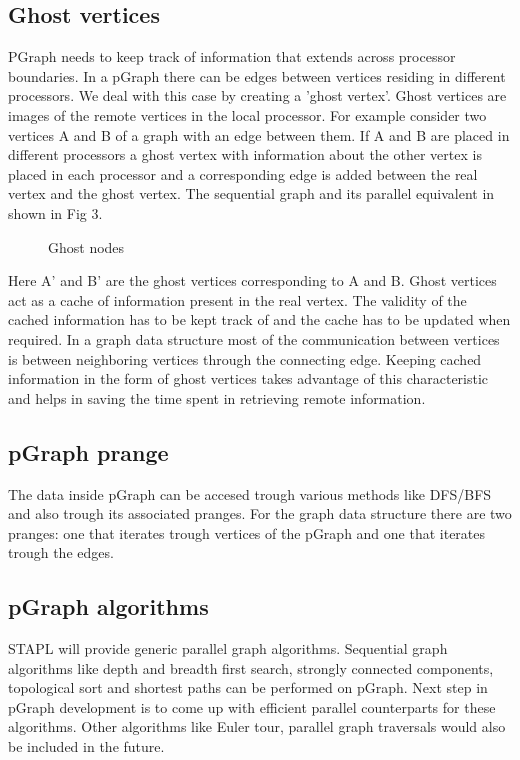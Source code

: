 \documentclass[12pt,epsfig]{article}
\begin{document}
\subsection{Ghost vertices}
PGraph needs to keep track of information that extends across
processor boundaries. In a pGraph there can be edges between
vertices residing in different processors. We deal with this case by
creating a 'ghost vertex'. Ghost vertices are images of the remote
vertices in the local processor. For example consider two vertices A
and B of a graph with an edge between them. If A and B are placed in
different processors a ghost vertex with information about the other
vertex is placed in each processor and a corresponding edge is added
between the real vertex and the ghost vertex. The sequential graph and
its parallel equivalent in shown in Fig 3.  


\begin{figure}
    \caption{Ghost nodes}
    \label{fig:fig1}
\end{figure}

Here A' and B' are the ghost vertices corresponding to A and B. Ghost
vertices act as a cache of information present in the real vertex. The
validity of the cached information has to be kept track of and the
cache has to be updated when required. In a graph data structure most
of the communication between vertices is between neighboring vertices
through the connecting edge. Keeping cached information in the form of
ghost vertices takes advantage of this characteristic and helps in
saving the time spent in retrieving remote information.

\subsection{pGraph prange}

The data inside pGraph can be accesed trough various methods like
DFS/BFS and also trough its associated pranges. For the graph data
structure there are two pranges: one that iterates trough vertices
of the pGraph and one that iterates trough the edges. 

\subsection{pGraph algorithms}

STAPL will provide generic parallel graph algorithms.  Sequential
graph algorithms like depth and breadth first search, strongly
connected components, topological sort and shortest paths can be
performed on pGraph. Next step in pGraph development is to
come up with efficient parallel counterparts for these
algorithms. Other algorithms like Euler tour, parallel graph
traversals would also be included in the future.

\end{document}
